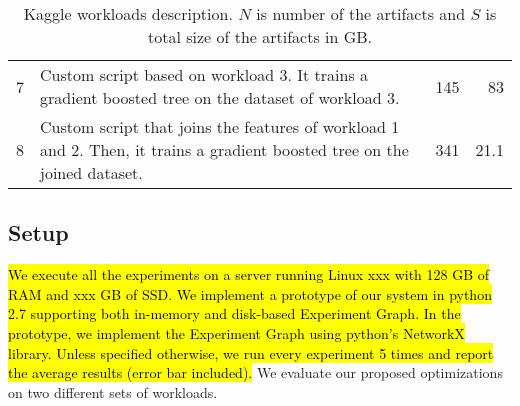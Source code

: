 \begin{table*}[t]
\begin{tabular}{lp{}rr}
7 & \parbox[t]{0.84\textwidth}{\linespread{0.5}\selectfont \small Custom script based on workload 3. It trains a gradient boosted tree on the dataset of workload 3.} & 145 & 83\\[0.15cm]

8 & \parbox[t]{0.84\textwidth}{\linespread{0.5}\selectfont \small Custom script that joins the features of workload 1 and 2. Then, it trains a gradient boosted tree on the joined dataset.} & 341 & 21.1\\
\hline
\end{tabular}
\caption{Kaggle workloads description. $N$ is number of the artifacts and $S$ is total size of the artifacts in GB.}
\label{kaggle-workload}
\end{table*}

\subsection{Setup}
\hl{We execute all the experiments on a server running Linux xxx with 128 GB of RAM and xxx GB of SSD.
We implement a prototype of our system in python 2.7 supporting both in-memory and disk-based Experiment Graph.
In the prototype, we implement the Experiment Graph using python's NetworkX library.
Unless specified otherwise, we run every experiment 5 times and report the average results (error bar included).}
We evaluate our proposed optimizations on two different sets of workloads.

